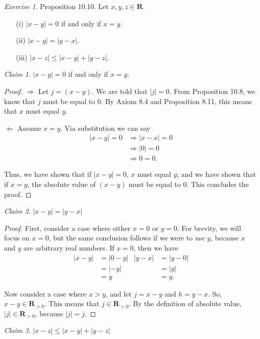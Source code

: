 \documentclass[12pt,oneside]{amsart}
\theoremstyle{remark}
\newtheorem{exer}{Exercise}
\newtheorem{claim}{Claim}[exer]
\newcommand{\bfR}{\mathbf{R}}
\begin{document}
%
%
%
%
\newpage
\begin{exer}
Proposition 10.10. Let $x, y, z \in \bfR$.
\begin{itemize}
  \item[ (i) ] $|x - y| = 0$ if and only if $x = y$.
  \item[ (ii) ] $|x - y| = |y - x|$.
  \item[ (iii) ] $|x - z| \leq |x - y| + |y - z|$.
\end{itemize}
\end{exer}
\begin{claim}
$|x - y| = 0$ if and only if $x = y$.
\end{claim}
\begin{proof}
$\Rightarrow$ Let $j = (x - y)$. We  are told that $|j| = 0$. From Proposition 10.8, we know that $j$ must be equal to 0. By Axiom 8.4 and Proposition 8.11, this means that $x$ must equal $y$.

$\Leftarrow$ Assume $x = y$. Via substitution we can say
\begin{equation}
\begin{split}
|x - y| = 0 &\Rightarrow |x - x| = 0 \\
            &\Rightarrow     |0| = 0 \\
            &\Rightarrow       0 = 0.
\end{split}
\end{equation}

Thus, we have shown that if $|x - y| = 0$, $x$ must equal $y$; and we have shown that if $x = y$, the absolute value of $(x - y)$ must be equal to 0. This concludes the proof.
\end{proof}

\begin{claim}
$|x - y| = |y - x|$
\end{claim}
\begin{proof}
First, consider a case where either $x = 0$ or $y = 0$. For brevity, we will focus on $x = 0$, but the same conclusion follows if we were to use $y$, because $x$ and $y$ are arbitrary real numbers. If $x = 0$, then we have
\begin{align*}
|x - y| &= |0 - y|  &  |y - x| &= |y - 0| \\
        &= |-y|     &          &= |y| \\
        &= y        &          &= y.
\end{align*}

Now consider a case where $x > y$, and let $j = x - y$ and $h = y - x$. So, $x - y \in \bfR_{>0}$. This means that $j \in \bfR_{>0}$. By the definition of absolute value, $|j| \in \bfR_{>0}$, because $|j| = j$.
\end{proof}

\begin{claim}
$|x - z| \leq |x - y| + |y - z|$
\end{claim}
\end{document}
